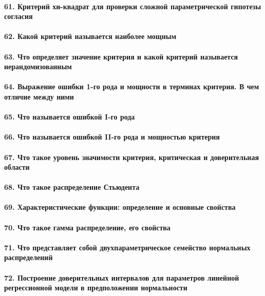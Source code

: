 \documentclass[titlepage]{article}
\begin{document}
\paragraph{61. Критерий хи-квадрат для проверки сложной параметрической гипотезы согласия}

\paragraph{62. Какой критерий называется наиболее мощным}

\paragraph{63. Что определяет значение критерия и какой критерий называется нерандомизованным}

\paragraph{64. Выражение ошибки 1-го рода и мощности в терминах критерия. В чем отличие между ними}

\paragraph{65. Что называется ошибкой I-го рода}

\paragraph{66. Что называется ошибкой II-го рода и мощностью критерия}

\paragraph{67. Что такое уровень значимости критерия, критическая и доверительная области}

\paragraph{68. Что такое распределение Стьюдента}

\paragraph{69. Характеристические функции: определение и основные свойства}

\paragraph{70. Что такое гамма распределение, его свойства}

\paragraph{71. Что представляет собой двухпараметрическое семейство нормальных распределений}

\paragraph{72. Построение доверительных интервалов для параметров линейной регрессионной модели в предположении нормальности}
\end{document}
